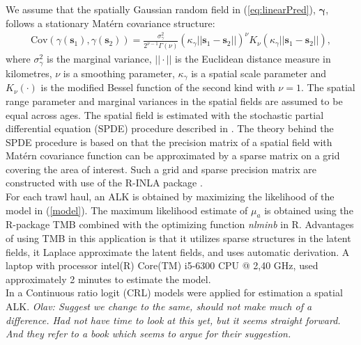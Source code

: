 \documentclass[a4paper 12pt]{article}
\numberwithin{equation}{section}
\begin{document}
\indent We assume that the spatially Gaussian random field in (\ref{eq:linearPred}), $\pmb{\gamma}$, follows a stationary Mat\'{e}rn covariance structure:
\begin{align}\label{eq:matern}
 \text{Cov}(\gamma(\mathbf{s}_1),\gamma(\mathbf{s}_2)) = \frac{\sigma^2_{\gamma}}{2^{\nu-1}\Gamma(\nu)}(\kappa_{\gamma}||\mathbf{s}_1 -\mathbf{s}_2||)^{\nu}K_{\nu}(\kappa_{\gamma}||\mathbf{s}_1-\mathbf{s}_2||),
\end{align}
where $\sigma^2_{\gamma}$ is the marginal variance, $||\cdot||$ is the Euclidean distance measure in kilometres, $\nu$ is a smoothing parameter, $\kappa_{\gamma}$ is a spatial scale parameter and $K_{\nu}(\cdot)$ is the modified Bessel function of the second kind with $\nu = 1$. The spatial range parameter and marginal variances in the spatial fields are assumed to be equal across ages. The spatial field is estimated with the stochastic partial differential equation (SPDE) procedure described in \citet{lindgren2011explicit}. The theory behind the SPDE procedure is based on that the precision matrix of a spatial field with Mat\'{e}rn  covariance function can be approximated by a sparse matrix on a grid covering the area of interest. Such a grid and sparse precision matrix are constructed with use of the R-INLA package \citep{rue2009approximate}.\\
\indent For each trawl haul, an ALK is obtained by maximizing the likelihood of the model in (\ref{model}). The maximum likelihood estimate of ${\mu}_{a}$  is obtained using the R-package TMB \citep{kristensen2015tmb} combined with the optimizing function \textit{nlminb} in R. Advantages of using TMB in this application is that it utilizes sparse structures in the latent fields, it Laplace approximate the latent fields, and uses automatic derivation. A laptop with  processor intel(R) Core(TM) i5-6300 CPU @ 2,40 GHz, used approximately 2 minutes to estimate the model. \\ 


In \citep{berg2012spatial} a Continuous ratio logit (CRL) models were applied for estimation a spatial ALK. \textit{Olav: Suggest we change to the same, should not make much of a difference. Had not have time to look at this yet, but it seems straight forward. And they refer to a book which seems to argue for their suggestion.} %
\end{document}
